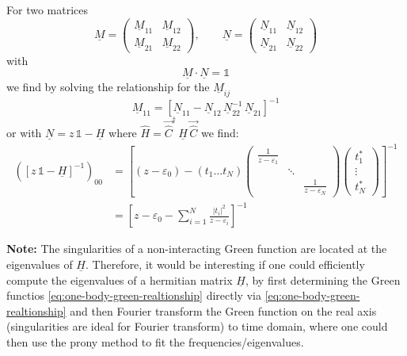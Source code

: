 For two matrices
\begin{equation*}
    \underline{M} = \begin{pmatrix} \underline{M}_{11} & \underline{M}_{12} \\ \underline{M}_{21} & \underline{M}_{22} \end{pmatrix}, \qquad
    \underline{N} = \begin{pmatrix} \underline{N}_{11} & \underline{N}_{12} \\ \underline{N}_{21} & \underline{N}_{22} \end{pmatrix}
\end{equation*}
with
\begin{equation*}
    \underline{M} \cdot \underline{N} = \mathbb{1}
\end{equation*}
we find by solving the relationship for the $\underline{M}_{ij}$
\begin{equation*}
    \underline{M}_{11} = \left[ \underline{N}_{11} - \underline{N}_{12}\, \underline{N}_{22}^{-1}\, \underline{N}_{21} \right]^{-1}
\end{equation*}
or with $\underline{N} = z\,\mathbb{1} - \underline{H}$ where $\hat{H} = \vec{\hat{C}}^{\dagger}\, \underline{H}\, \vec{\hat{C}}$ we find:
\begin{align*}
    \left( \left[ z\,\mathbb{1} - \underline{H} \right]^{-1} \right)_{00} &= \left[ (z - \varepsilon_0) - (t_1 \dots t_N)
    \begin{pmatrix} \frac{1}{z - \varepsilon_1} & & \\ & \ddots & \\ & & \frac{1}{z - \varepsilon_N} \end{pmatrix}
    \begin{pmatrix} t_1^{*} \\ \vdots \\ t_N^{*} \end{pmatrix} \right]^{-1} \\[1ex]
    &= \left[ z - \varepsilon_0 - \sum_{i=1}^{N} \frac{|t_i|^2}{z - \varepsilon_i} \right]^{-1}
\end{align*}

\textbf{Note:} The singularities of a non-interacting Green function are located at the eigenvalues of $\underline{H}$. Therefore, it would be interesting if one could efficiently compute the eigenvalues of a hermitian matrix $\underline{H}$,
by first determining the Green functios \eqref{eq:one-body-green-realtionship} directly via \eqref{eq:one-body-green-realtionship} and then Fourier transform the Green function on the real axis (singularities are ideal for Fourier transform)
to time domain, where one could then use the prony method to fit the frequencies/eigenvalues.

